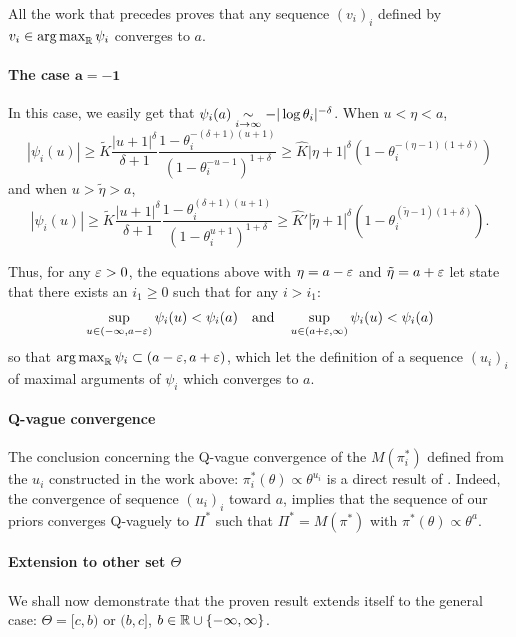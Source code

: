     All the work that precedes proves that any sequence $(v_i)_i$ defined by $v_i\in\operatorname*{arg\,max}_{\mathbb{R}}\psi_i$ converges to $a$.
    

\paragraph{The case $\mathbf{a=-1}$}
In this case, we easily get that $\psi_i(a)\underset{i\rightarrow\infty}{\sim}-|\log\theta_i|^{-\delta}$. 
When $u<\eta<a$, 
    \begin{equation}
        |\psi_i(u)|\geq\tilde K\frac{|u+1|^{\delta}}{\delta+1} \frac{1-\theta_i^{-(\delta+1)(u+1)}}{(1-\theta_i^{-u-1})^{1+\delta}}\geq \hat K {|\eta+1|^{\delta}}(1-\theta_i^{-(\eta-1)({1+\delta})})
    \end{equation}
and when $u>\tilde\eta>a$,
    \begin{equation}
        |\psi_i(u)|\geq\tilde K\frac{|u+1|^{\delta}}{\delta+1} \frac{1-\theta_i^{(\delta+1)(u+1)}}{(1-\theta_i^{u+1})^{1+\delta}}\geq \hat K' {|\tilde\eta+1|^{\delta}}(1-\theta_i^{(\tilde\eta-1)({1+\delta})}).
    \end{equation}


Thus, for any $\varepsilon>0$, the equations above with $\eta=a-\varepsilon$ and $\tilde\eta=a+\varepsilon$ let state that there exists an $i_1\geq0$ such that for any $i>i_1$:
    \begin{equation}
        \sup_{u\in(-\infty,a-\varepsilon)}\psi_i(u)<\psi_i(a)\quad\text{and} \quad\sup_{u\in(a+\varepsilon,\infty)}\psi_i(u)<\psi_i(a)
    \end{equation}
so that $\operatorname*{arg\,max}_{\mathbb{R}}\psi_i\subset(a-\varepsilon,a+\varepsilon)$, which let the definition of a sequence $(u_i)_i$ of maximal arguments of $\psi_i$ which converges to $a$.


\paragraph{Q-vague convergence}
The conclusion concerning the Q-vague convergence of the $M(\pi_i^\ast)$ defined from the $u_i$ constructed in the work above: $\pi_i^\ast(\theta)\propto\theta^{u_i}$ is a direct result of \cite[Proposition 2.16]{bioche_approximation_2016}. Indeed, the convergence of sequence $(u_i)_i$ toward $a$, implies that the sequence of our priors converges Q-vaguely to $\varPi^\ast$ such that $\varPi^\ast = M(\pi^\ast)$ with $\pi^\ast(\theta)\propto{\theta^a}$.



\paragraph{Extension to other set $\Theta$}
We shall now demonstrate that the proven result extends itself to the general case: $\Theta=[c,b)$ or $(b,c]$, $b\in\mathbb{R}\cup\{-\infty,\infty\}$.

